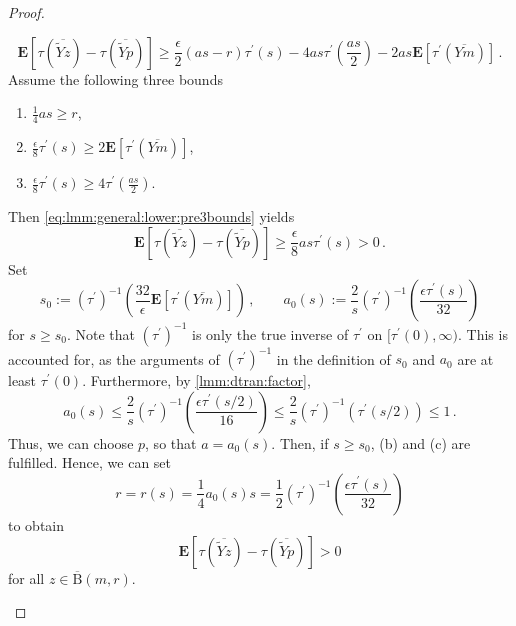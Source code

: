 \documentclass{article}
\newcommand{\ball}{\mathrm{B}}
\newcommand{\lab}{\left[} %
\newcommand{\rab}{\right]} %
\newcommand{\ab}[1]{\lab #1 \rab} %
\newcommand{\abOf}[1]{\!\ab{#1}} %
\newcommand{\lb}{\left(} %
\newcommand{\rb}{\right)} %
\newcommand{\br}[1]{\lb #1 \rb} %
\newcommand{\brOf}[1]{\!\br{#1}} %
\newcommand{\E}{\mathbf{E}} %
\newcommand{\Eof}[1]{\E[#1]}
\newcommand{\EOf}[1]{\E\abOf{#1}}
\newcommand{\pr}{^\prime}
\newcommand{\eqcm}{\,,} %
\newcommand{\eqfs}{\,.}
\newcommand{\ol}[2]{\overline{#1#2}}
\newcommand{\tran}{\tau}
\newcommand{\dtran}{\tau\pr}
\newcommand{\invdtran}{(\tau\pr)^{-1}}
\newcommand{\ballclosed}{\overline{\ball}}
\begin{document}
\begin{proof}
\begin{enumerate}[label=(\roman*)]
\begin{equation}
            \EOf{\tran(\ol {\tilde Y}z) - \tran(\ol {\tilde Y}p)}
            \geq
            \frac{\epsilon}2 \br{as-r} \dtran(s) 
            -
            4 as \dtran\brOf{\frac{as}2}
            - 2as \EOf{\dtran\brOf{\ol {Y}m}}
            \eqfs
        \end{equation}
        Assume the following three bounds
        \begin{enumerate}[label=(\alph*)]
            \item $\frac14as \geq r$,
            \item $\frac\epsilon8 \dtran(s) \geq 2 \Eof{\dtran(\ol {Y}m)}$,
            \item $ \frac{\epsilon}8 \dtran(s) \geq 4 \dtran\brOf{\frac{as}{2}}$.
        \end{enumerate}
        Then \eqref{eq:lmm:general:lower:pre3bounds} yields
        \begin{equation}
            \EOf{\tran(\ol {\tilde Y}z) - \tran(\ol {\tilde Y}p)}
            \geq
            \frac{\epsilon}8 as \dtran(s) > 0
            \eqfs
        \end{equation}
        Set 
        \begin{equation}
            s_0 := \invdtran\brOf{\frac{32}{\epsilon} \EOf{\dtran(\ol {Y}m)}}
            \eqcm\qquad
            a_0(s) := \frac2s \invdtran\brOf{\frac{\epsilon \dtran(s)}{32}}
        \end{equation}
        for $s \geq s_0$. Note that $\invdtran$ is only the true inverse of $\dtran$ on $[\dtran(0), \infty)$. This is accounted for, as the arguments of $\invdtran$ in the definition of $s_0$ and $a_0$ are at least $\dtran(0)$. 
        Furthermore, by \cref{lmm:dtran:factor},
        \begin{equation}
            a_0(s) \leq \frac2s \invdtran\brOf{\frac{\epsilon \dtran(s/2)}{16}} \leq \frac2s\invdtran\brOf{\dtran(s/2)} \leq 1
            \eqfs
        \end{equation}
        Thus, we can choose $p$, so that $a = a_0(s)$. Then, if $s \geq s_0$, (b) and (c) are fulfilled.
        Hence, we can set
        \begin{equation}
            r = r(s) = \frac14 a_0(s) s = \frac12 \invdtran\brOf{\frac{\epsilon \dtran(s)}{32}}
        \end{equation}
        to obtain 
        \begin{equation}
            \EOf{\tran(\ol {\tilde Y}z) - \tran(\ol {\tilde Y}p)} > 0
        \end{equation}
        for all $z \in \ballclosed(m, r)$. 

\end{enumerate}
\end{proof}
\end{document}
